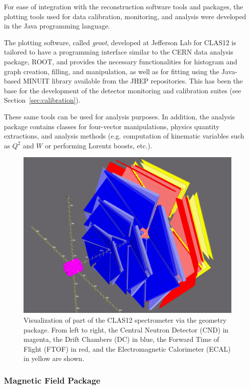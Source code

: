 For ease of integration with the reconstruction software tools and packages, the plotting tools used for data
calibration, monitoring, and analysis were developed in the Java programming language.

The plotting software, called {\it groot}, developed at Jefferson Lab for CLAS12 is tailored to have a programming
interface similar to the CERN data analysis package, ROOT, and provides the necessary functionalities for
histogram and graph creation, filling, and manipulation, as well as for fitting using the Java-based MINUIT library
available from the JHEP repositories. This has been the base for the development of the detector monitoring and
calibration suites (see Section~\ref{sec:calibration}).

These same tools can be used for analysis purposes. In addition, the analysis package contains classes for four-vector
manipulations, physics quantity extractions, and analysis methods (e.g. computation of kinematic variables such as
$Q^2$ and $W$ or performing Lorentz boosts, etc.).

\begin{figure}
\centering
\includegraphics[width=1.0\columnwidth]{pics/detectorview.png}
\caption{Visualization of part of the CLAS12 spectrometer via the geometry package. From left to right, the Central
  Neutron Detector (CND) in magenta, the Drift Chambers (DC) in blue, the Forward Time of Flight (FTOF) in red,
  and the Electromagnetic Calorimeter (ECAL) in yellow are shown.}
\label{fig:detectorview}
\end{figure}

\subsubsection{Magnetic Field Package}

